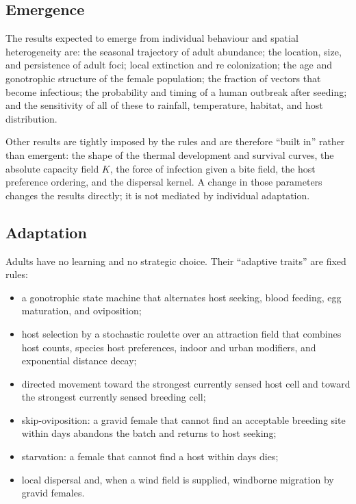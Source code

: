 \documentclass[11pt,a4paper]{article}
\begin{document}
\subsection{Emergence}

The results expected to emerge from individual behaviour and spatial
heterogeneity are: the seasonal trajectory of adult abundance; the
location, size, and persistence of adult foci; local extinction and
re colonization; the age and gonotrophic structure of the female
population; the fraction of vectors that become infectious; the
probability and timing of a human outbreak after seeding; and the
sensitivity of all of these to rainfall, temperature, habitat, and host
distribution.

Other results are tightly imposed by the rules and are therefore
``built in'' rather than emergent: the shape of the thermal development
and survival curves, the absolute capacity field $K$, the force of
infection given a bite field, the host preference ordering, and the
dispersal kernel. A change in those parameters changes the results
directly; it is not mediated by individual adaptation.

\subsection{Adaptation}

Adults have no learning and no strategic choice. Their ``adaptive
traits'' are fixed rules:

\begin{itemize}
\item a gonotrophic state machine that alternates host seeking, blood
  feeding, egg maturation, and oviposition;
\item host selection by a stochastic roulette over an attraction field
  that combines host counts, species host preferences, indoor and urban
  modifiers, and exponential distance decay;
\item directed movement toward the strongest currently sensed host cell
  and toward the strongest currently sensed breeding cell;
\item skip-oviposition: a gravid female that cannot find an acceptable
  breeding site within  days abandons the
  batch and returns to host seeking;
\item starvation: a female that cannot find a host within
   days dies;
\item local dispersal and, when a wind field is supplied, windborne
  migration by gravid females.
\end{itemize}
\end{document}
